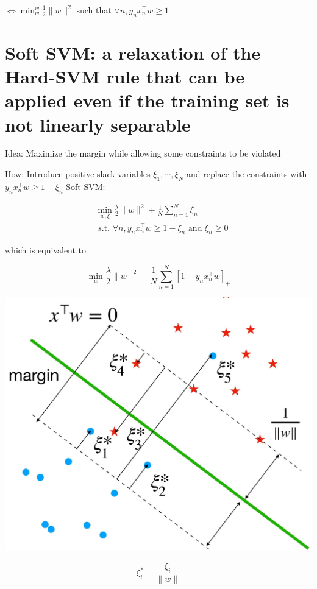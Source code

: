 \documentclass[10pt]{article}
\begin{document}
$\Longleftrightarrow \min _{w}^{w} \frac{1}{2}\|w\|^{2}$ such that $\forall n, y_{n} x_{n}^{\top} w \geq 1$

\section*{Soft SVM: a relaxation of the Hard-SVM rule that can be applied even if the training set is not linearly separable}
Idea: Maximize the margin while allowing some constraints to be violated

How: Introduce positive slack variables $\xi_{1}, \cdots, \xi_{N}$ and replace the constraints with $y_{n} x_{n}^{\top} w \geq 1-\xi_{n}$ Soft SVM:

$$
\begin{aligned}
& \min _{w, \xi} \frac{\lambda}{2}\|w\|^{2}+\frac{1}{N} \sum_{n=1}^{N} \xi_{n} \\
& \text { s.t. } \forall n, y_{n} x_{n}^{\top} w \geq 1-\xi_{n} \text { and } \xi_{n} \geq 0
\end{aligned}
$$

which is equivalent to

$$
\min _{w} \frac{\lambda}{2}\|w\|^{2}+\frac{1}{N} \sum_{n=1}^{N}\left[1-y_{n} x_{n}^{\top} w\right]_{+}
$$

\begin{center}
\includegraphics[max width=\textwidth]{2023_12_30_bf5d191916c1e78fa6d6g-09}
\end{center}

$$
\xi_{i}^{*}=\frac{\xi_{i}}{\|w\|}
$$
\end{document}

